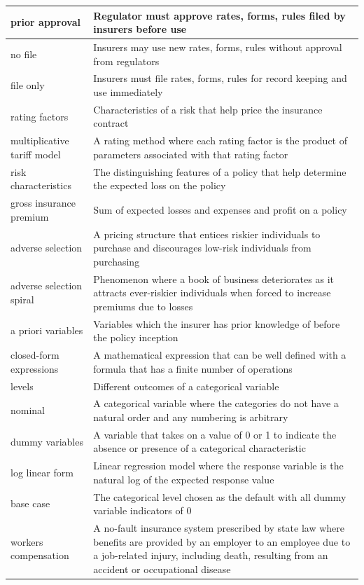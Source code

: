 \documentclass[
]{book}
\begin{document}
\begin{longtable}{>{\raggedright\arraybackslash}p{10em}|>{\raggedright\arraybackslash}p{30em}}
\hline
prior approval & Regulator must approve rates, forms, rules filed by insurers before use\\
\hline
no file & Insurers may use new rates, forms, rules without approval from regulators\\
\hline
file only & Insurers must file rates, forms, rules for record keeping and use immediately\\
\hline
rating factors & Characteristics of a risk that help price the insurance contract\\
\hline
multiplicative tariff model & A rating method where each rating factor is the product of parameters associated with that rating factor\\
\hline
risk characteristics & The distinguishing features of a policy that help determine the expected loss on the policy\\
\hline
gross insurance premium & Sum of expected losses and expenses and profit on a policy\\
\hline
adverse selection & A pricing structure that entices riskier individuals to purchase and discourages low-risk individuals from purchasing\\
\hline
adverse selection spiral & Phenomenon where a book of business deteriorates as it attracts ever-riskier individuals when forced to increase premiums due to losses\\
\hline
a priori variables & Variables which the insurer has prior knowledge of before the policy inception\\
\hline
closed-form expressions & A mathematical expression that can be well defined with a formula that has a finite number of operations\\
\hline
levels & Different outcomes of a categorical variable\\
\hline
nominal & A categorical variable where the categories do not have a natural order and any numbering is arbitrary\\
\hline
dummy variables & A variable that takes on a value of 0 or 1 to indicate the absence or presence of a categorical characteristic\\
\hline
log linear form & Linear regression model where the response variable is the natural log of the expected response value\\
\hline
base case & The categorical level chosen as the default with all dummy variable indicators of 0\\
\hline
workers compensation & A no-fault insurance system prescribed by state law where benefits are provided by an employer to an employee due to a job-related injury, including death, resulting from an accident or occupational disease\\

\end{longtable}
\end{document}
